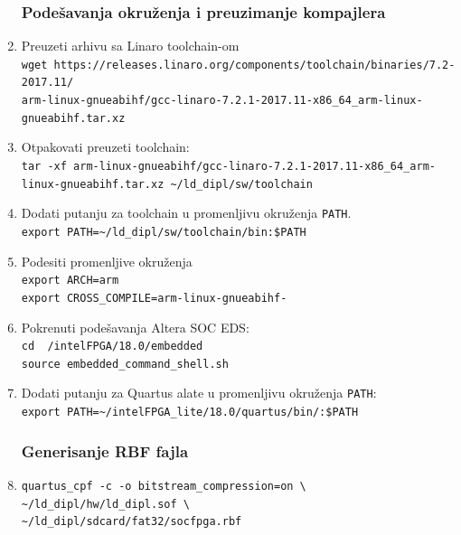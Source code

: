 \begin{enumerate}
\subsubsection{Podešavanja okruženja i preuzimanje kompajlera}
\item Preuzeti arhivu sa Linaro toolchain-om\\
\texttt{wget https://releases.linaro.org/components/toolchain/binaries/7.2-2017.11/\\arm-linux-gnueabihf/gcc-linaro-7.2.1-2017.11-x86\_64\_arm-linux-gnueabihf.tar.xz}
\item Otpakovati preuzeti toolchain:\\
\texttt{tar -xf arm-linux-gnueabihf/gcc-linaro-7.2.1-2017.11-x86\_64\_arm-linux-gnueabihf.tar.xz \textasciitilde/ld\_dipl/sw/toolchain}
\item Dodati putanju za toolchain u promenljivu okruženja \texttt{PATH}.\\
\texttt{export PATH=\textasciitilde/ld\_dipl/sw/toolchain/bin:\$PATH}
\item Podesiti promenljive okruženja\\
\texttt{export ARCH=arm}\\
\texttt{export CROSS\_COMPILE=arm-linux-gnueabihf-}\\
\item Pokrenuti podešavanja Altera SOC EDS:\\ 
\texttt{cd ~/intelFPGA/18.0/embedded}\\
\texttt{source embedded\_command\_shell.sh}
\item Dodati putanju za Quartus alate u promenljivu okruženja \texttt{PATH}:\\
\texttt{export PATH=\textasciitilde/intelFPGA\_lite/18.0/quartus/bin/:\$PATH}

\subsubsection{Generisanje RBF fajla}
\item \texttt{quartus\_cpf -c -o bitstream\_compression=on \textbackslash \\ \textasciitilde/ld\_dipl/hw/ld\_dipl.sof \textbackslash \\ \textasciitilde/ld\_dipl/sdcard/fat32/socfpga.rbf}

\end{enumerate}
